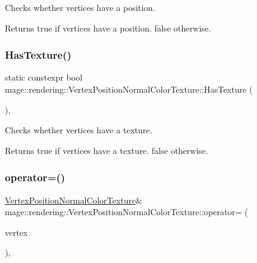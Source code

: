 Checks whether vertices have a position.

\begin{DoxyReturn}{Returns}
{\ttfamily true} if vertices have a position. {\ttfamily false} otherwise. 
\end{DoxyReturn}
\mbox{\label{structmage_1_1rendering_1_1_vertex_position_normal_color_texture_a8b5e0a50a6119868ebf90247d321f172}} 
\subsubsection{\texorpdfstring{Has\+Texture()}{HasTexture()}}
{\footnotesize\ttfamily static constexpr bool mage\+::rendering\+::\+Vertex\+Position\+Normal\+Color\+Texture\+::\+Has\+Texture (\begin{DoxyParamCaption}{ }\end{DoxyParamCaption})\hspace{0.3cm}{\ttfamily [static]}, {\ttfamily [noexcept]}}

Checks whether vertices have a texture.

\begin{DoxyReturn}{Returns}
{\ttfamily true} if vertices have a texture. {\ttfamily false} otherwise. 
\end{DoxyReturn}
\mbox{\label{structmage_1_1rendering_1_1_vertex_position_normal_color_texture_a1294256508192d8a1682005225d9d8bb}} 
\subsubsection{\texorpdfstring{operator=()}{operator=()}\hspace{0.1cm}{\footnotesize\ttfamily [1/2]}}
{\footnotesize\ttfamily \mbox{\hyperlink{structmage_1_1rendering_1_1_vertex_position_normal_color_texture}{Vertex\+Position\+Normal\+Color\+Texture}}\& mage\+::rendering\+::\+Vertex\+Position\+Normal\+Color\+Texture\+::operator= (\begin{DoxyParamCaption}\item[{const \mbox{\hyperlink{structmage_1_1rendering_1_1_vertex_position_normal_color_texture}{Vertex\+Position\+Normal\+Color\+Texture}} \&}]{vertex }\end{DoxyParamCaption})\hspace{0.3cm}{\ttfamily [default]}, {\ttfamily [noexcept]}}

